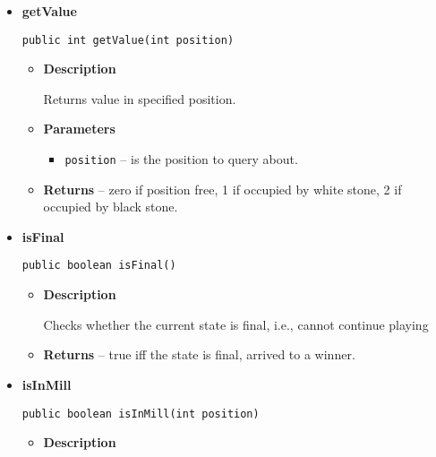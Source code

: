 \documentclass[11pt,a4paper]{report}
\begin{document}
{{{{{{{{{{{\begin{itemize}
{\begin{itemize}
{Returns the number of free adjacent positions to a given position in the board.
}
\item{
{\bf  Parameters}
  \begin{itemize}
   \item{
\texttt{position} -- is the position to query about.}
  \end{itemize}
}%
\item{{\bf  Returns} -- 
the number of adjacent positions to position, which are free. 
}%
\end{itemize}
}%
\item{ 
{\bf  getValue}\\
\begin{lstlisting}[frame=none]
public int getValue(int position)\end{lstlisting} %
\begin{itemize}
\item{
{\bf  Description}

Returns value in specified position.
}
\item{
{\bf  Parameters}
  \begin{itemize}
   \item{
\texttt{position} -- is the position to query about.}
  \end{itemize}
}%
\item{{\bf  Returns} -- 
zero if position free, 1 if occupied by white stone, 2 if occupied by black stone. 
}%
\end{itemize}
}%
\item{ 
{\bf  isFinal}\\
\begin{lstlisting}[frame=none]
public boolean isFinal()\end{lstlisting} %
\begin{itemize}
\item{
{\bf  Description}

Checks whether the current state is final, i.e., cannot continue playing
}
\item{{\bf  Returns} -- 
true iff the state is final, arrived to a winner. 
}%
\end{itemize}
}%
\item{ 
{\bf  isInMill}\\
\begin{lstlisting}[frame=none]
public boolean isInMill(int position)\end{lstlisting} %
\begin{itemize}
\item{
{\bf  Description}

}
\end{itemize}}
\end{itemize}}}}}}}}}}}}
\end{document}
